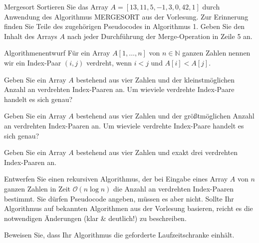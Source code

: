 \documentclass{article}
\begin{document}
\begin{exercise}{Mergesort}
  Sortieren Sie das Array $A = [13,11,5, -1,3,0,42,1]$ durch Anwendung des Algorithmus MERGESORT aus der Vorlesung. Zur Erinnerung finden Sie Teile des zugehörigen Pseudocodes in Algorithmus 1. Geben Sie den Inhalt des Arrays $A$ nach jeder Durchführung der Merge-Operation in Zeile 5 an.
  \begin{algorithm}[ht]
    \caption{MERGESORT($A, l, r$)}
  \end{algorithm}
\end{exercise}

\begin{eexercises}{Algorithmenentwurf}{
    Für ein Array $A[1, \ldots, n]$ von $n \in \mathbb{N}$ ganzen Zahlen nennen wir ein Index-Paar $(i, j)$ verdreht, wenn $i < j$ und $A[i] < A[j]$.
  }
  \item Geben Sie ein Array $A$ bestehend aus vier Zahlen und der kleinstmöglichen Anzahl an verdrehten Index-Paaren an. Um wieviele verdrehte Index-Paare handelt es sich genau?
  \item Geben Sie ein Array $A$ bestehend aus vier Zahlen und der größtmöglichen Anzahl an verdrehten Index-Paaren an. Um wieviele verdrehte Index-Paare handelt es sich genau?
  \item Geben Sie ein Array $A$ bestehend aus vier Zahlen und exakt drei verdrehten Index-Paaren an.
  \item Entwerfen Sie einen rekursiven Algorithmus, der bei Eingabe eines Array $A$ von $n$ ganzen Zahlen in Zeit $\mathcal{O}(n \log n)$ die Anzahl an verdrehten Index-Paaren bestimmt. Sie dürfen Pseudocode angeben, müssen es aber nicht. Sollte Ihr Algorithmus auf bekannten Algorithmen aus der Vorlesung basieren, reicht es die notwendigen Änderungen (klar \& deutlich!) zu beschreiben.
  \item Beweisen Sie, dass Ihr Algorithmus die geforderte Laufzeitschranke einhält.
\end{eexercises}
\end{document}
